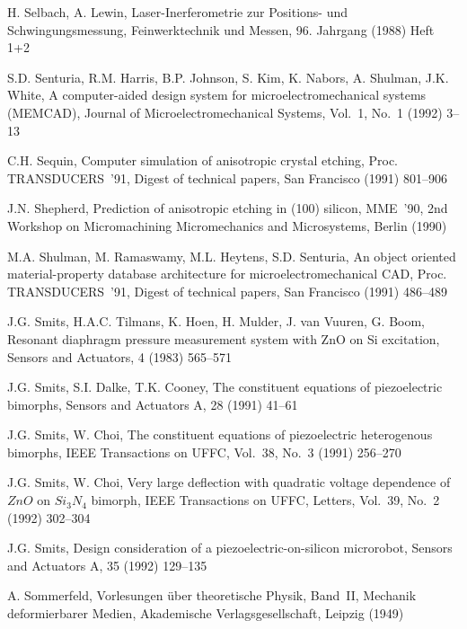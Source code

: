 \begin{thebibliography}{xxx}
 H. Selbach, A. Lewin, Laser-Inerferometrie zur Positions- und
 Schwingungsmessung, Feinwerktechnik und Messen, 96. Jahrgang (1988) Heft 1+2

 S.D. Senturia, R.M. Harris, B.P. Johnson, S. Kim, K. Nabors, A. Shulman,
 J.K. White, A computer-aided design system for microelectromechanical
 systems ({\sf MEMCAD}), Journal of Microelectromechanical Systems, Vol.~1,
 No.~1 (1992) 3--13

 C.H. Sequin, Computer simulation of anisotropic crystal etching, Proc.
 TRANSDUCERS~'91, Digest of technical papers, San Francisco (1991) 801--906

 J.N. Shepherd, Prediction of anisotropic etching in (100) silicon,
 MME~'90, 2nd Workshop on Micromachining Micromechanics and Microsystems,
 Berlin (1990)

 M.A. Shulman, M. Ramaswamy, M.L. Heytens, S.D. Senturia, An object oriented
 material-property database architecture for microelectromechanical CAD,
 Proc. TRANSDUCERS~'91, Digest of technical papers, San Francisco
 (1991) 486--489

 J.G. Smits, H.A.C. Tilmans, K. Hoen, H. Mulder, J. van Vuuren, G. Boom,
 Resonant diaphragm pressure measurement system with ZnO on Si excitation,
 Sensors and Actuators, 4 (1983) 565--571

 J.G. Smits, S.I. Dalke, T.K. Cooney, The constituent equations of
 piezoelectric bimorphs, Sensors and Actuators A, 28 (1991) 41--61

 J.G. Smits, W. Choi, The constituent equations of piezoelectric
 heterogenous bimorphs, IEEE Transactions on UFFC, Vol.~38, No.~3 (1991)
 256--270

 J.G. Smits, W. Choi, Very large deflection with quadratic voltage dependence
 of $ZnO$ on $Si_{3}N_{4}$ bimorph, IEEE Transactions on UFFC, Letters,
 Vol.~39, No.~2 (1992) 302--304

 J.G. Smits, Design consideration of a piezoelectric-on-silicon microrobot,
 Sensors and Actuators A, 35 (1992) 129--135

 A. Sommerfeld, Vorlesungen über theoretische Physik, Band~II, Mechanik
 deformierbarer Medien, Akademische Verlagsgesellschaft, Leipzig (1949)


\end{thebibliography}

